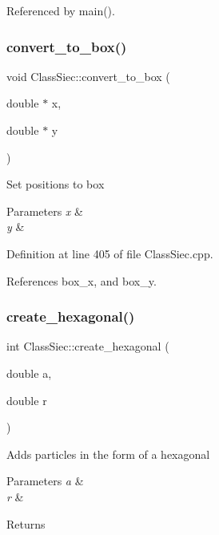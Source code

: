 Referenced by main().

\mbox{\label{classClassSiec_ab883e160c0a8878ce20b8a27fea9b65f}} 
\subsubsection{\texorpdfstring{convert\+\_\+to\+\_\+box()}{convert\_to\_box()}}
{\footnotesize\ttfamily void Class\+Siec\+::convert\+\_\+to\+\_\+box (\begin{DoxyParamCaption}\item[{double $\ast$}]{x,  }\item[{double $\ast$}]{y }\end{DoxyParamCaption})}

Set positions to box 
\begin{DoxyParams}{Parameters}
{\em x} & \\
\hline
{\em y} & \\
\hline
\end{DoxyParams}


Definition at line 405 of file Class\+Siec.\+cpp.



References box\+\_\+x, and box\+\_\+y.

\mbox{\label{classClassSiec_af9d21e3ef4441737d3c64271c5752532}} 
\subsubsection{\texorpdfstring{create\+\_\+hexagonal()}{create\_hexagonal()}\hspace{0.1cm}{\footnotesize\ttfamily [1/2]}}
{\footnotesize\ttfamily int Class\+Siec\+::create\+\_\+hexagonal (\begin{DoxyParamCaption}\item[{double}]{a,  }\item[{double}]{r }\end{DoxyParamCaption})}

Adds particles in the form of a hexagonal 
\begin{DoxyParams}{Parameters}
{\em a} & \\
\hline
{\em r} & \\
\hline
\end{DoxyParams}
\begin{DoxyReturn}{Returns}

\end{DoxyReturn}


